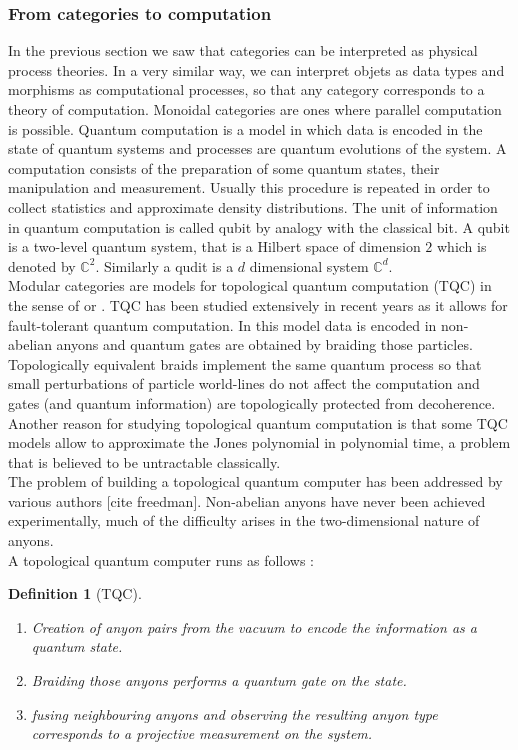 \documentclass{article}
\newtheorem{definition}{Definition}
\begin{document}
\subsubsection{From categories to computation}
In the previous section we saw that categories can be interpreted as physical process theories. In a very similar way, we can interpret objets as data types and morphisms as computational processes, so that any category corresponds to a theory of computation. Monoidal categories are ones where parallel computation is possible. Quantum computation is a model in which data is encoded in the state of quantum systems and processes are quantum evolutions of the system. A computation consists of the preparation of some quantum states, their manipulation and measurement. Usually this procedure is repeated in order to collect statistics and approximate density distributions. The unit of information in quantum computation is called qubit by analogy with the classical bit. A qubit is a two-level quantum system, that is a Hilbert space of dimension $2$ which is denoted by $\mathbb{C}^2$. Similarly a qudit is a $d$ dimensional system $\mathbb{C}^d$.\\
Modular categories are models for topological quantum computation (TQC) in the sense of \cite{Kitaev03} or \cite{Rowell17}. TQC has been studied extensively in recent years as it allows for fault-tolerant quantum computation. In this model data is encoded in non-abelian anyons and quantum gates are obtained by braiding those particles. Topologically equivalent braids implement the same quantum process so that small perturbations of particle world-lines do not affect the computation and gates (and quantum information) are topologically protected from decoherence.
Another reason for studying topological quantum computation is that some TQC models allow to approximate the Jones polynomial in polynomial time, a problem that is believed to be untractable classically.\\
The problem of building a topological quantum computer has been addressed by various authors \cite{Kitaev03} [cite freedman]. Non-abelian anyons have never been achieved experimentally, much of the difficulty arises in the two-dimensional nature of anyons.\\
A topological quantum computer runs as follows \cite{Rowell17}:
\begin{definition}[TQC]
	\begin{enumerate}
		\item Creation of anyon pairs from the vacuum to encode the information as a quantum state.
		\item Braiding those anyons performs a quantum gate on the state.
		\item fusing neighbouring anyons and observing the resulting anyon type corresponds to a projective measurement on the system.
	\end{enumerate}
\end{definition}
\end{document}
